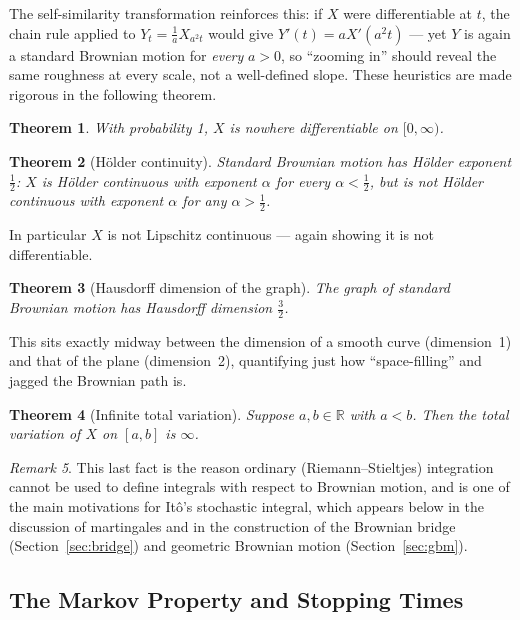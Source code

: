 \documentclass[12pt,openany]{book}
\newtheorem{theorem}{Theorem}[section]
\theoremstyle{definition}
\theoremstyle{remark}
\newtheorem{remark}[theorem]{Remark}
\newcommand{\R}{\mathbb{R}}
\begin{document}
The self-similarity transformation reinforces this: if $X$ were differentiable at $t$, the chain rule applied to $Y_t = \frac1a X_{a^2t}$ would give $Y'(t) = aX'(a^2t)$ — yet $Y$ is again a standard Brownian motion for \emph{every} $a>0$, so ``zooming in'' should reveal the same roughness at every scale, not a well-defined slope. These heuristics are made rigorous in the following theorem.
 
\begin{theorem}
With probability 1, $X$ is nowhere differentiable on $[0,\infty)$.
\end{theorem}
 
\begin{theorem}[H\"older continuity]
Standard Brownian motion has H\"older exponent $\tfrac12$: $X$ is H\"older continuous with exponent $\alpha$ for every $\alpha < \tfrac12$, but is not H\"older continuous with exponent $\alpha$ for any $\alpha > \tfrac12$.
\end{theorem}
 
In particular $X$ is not Lipschitz continuous — again showing it is not differentiable.
 
\begin{theorem}[Hausdorff dimension of the graph]
The graph of standard Brownian motion has Hausdorff dimension $\tfrac32$.
\end{theorem}
 
This sits exactly midway between the dimension of a smooth curve (dimension~1) and that of the plane (dimension~2), quantifying just how ``space-filling'' and jagged the Brownian path is.
 
\begin{theorem}[Infinite total variation]
Suppose $a,b \in \R$ with $a<b$. Then the total variation of $X$ on $[a,b]$ is $\infty$.
\end{theorem}
 
\begin{remark}
This last fact is the reason ordinary (Riemann–Stieltjes) integration cannot be used to define integrals with respect to Brownian motion, and is one of the main motivations for It\^o's stochastic integral, which appears below in the discussion of martingales and in the construction of the Brownian bridge (Section~\ref{sec:bridge}) and geometric Brownian motion (Section~\ref{sec:gbm}).
\end{remark}
 
\subsection{The Markov Property and Stopping Times}
\label{sec:markov}
 
\end{document}
